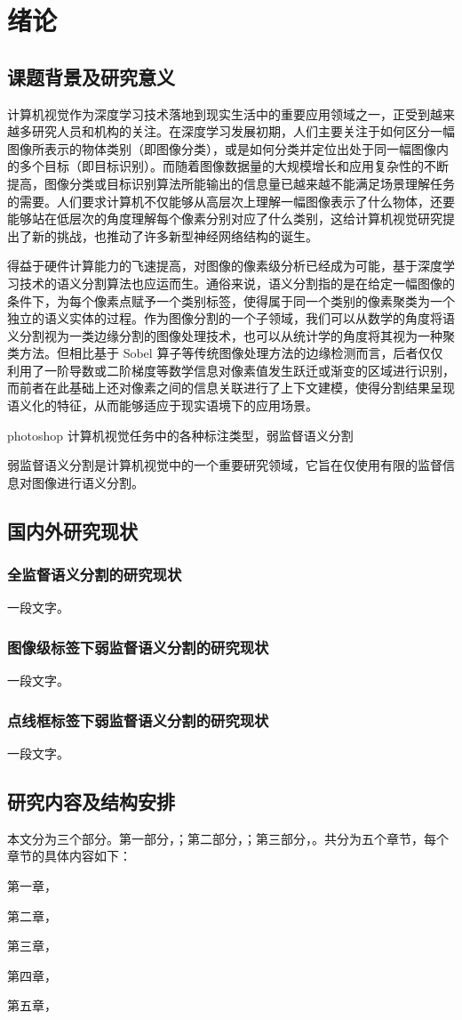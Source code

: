 \chapter{绪论}
\section{课题背景及研究意义}
计算机视觉作为深度学习技术落地到现实生活中的重要应用领域之一，正受到越来越多研究人员和机构的关注。在深度学习发展初期，人们主要关注于如何区分一幅图像所表示的物体类别（即图像分类），或是如何分类并定位出处于同一幅图像内的多个目标（即目标识别）。而随着图像数据量的大规模增长和应用复杂性的不断提高，图像分类或目标识别算法所能输出的信息量已越来越不能满足场景理解任务的需要。人们要求计算机不仅能够从高层次上理解一幅图像表示了什么物体，还要能够站在低层次的角度理解每个像素分别对应了什么类别，这给计算机视觉研究提出了新的挑战，也推动了许多新型神经网络结构的诞生。
\par
得益于硬件计算能力的飞速提高，对图像的像素级分析已经成为可能，基于深度学习技术的语义分割算法也应运而生。通俗来说，语义分割指的是在给定一幅图像的条件下，为每个像素点赋予一个类别标签，使得属于同一个类别的像素聚类为一个独立的语义实体的过程。作为图像分割的一个子领域，我们可以从数学的角度将语义分割视为一类边缘分割的图像处理技术，也可以从统计学的角度将其视为一种聚类方法。但相比基于 Sobel 算子等传统图像处理方法的边缘检测而言，后者仅仅利用了一阶导数或二阶梯度等数学信息对像素值发生跃迁或渐变的区域进行识别，而前者在此基础上还对像素之间的信息关联进行了上下文建模，使得分割结果呈现语义化的特征，从而能够适应于现实语境下的应用场景。
\par
photoshop
计算机视觉任务中的各种标注类型，弱监督语义分割

弱监督语义分割是计算机视觉中的一个重要研究领域，它旨在仅使用有限的监督信息对图像进行语义分割。
\section{国内外研究现状}
\subsection{全监督语义分割的研究现状}
一段文字。
\subsection{图像级标签下弱监督语义分割的研究现状}
一段文字。
\subsection{点线框标签下弱监督语义分割的研究现状}
一段文字。
\section{研究内容及结构安排}
本文分为三个部分。第一部分，；第二部分，；第三部分，。共分为五个章节，每个章节的具体内容如下：
\par
第一章，
\par
第二章，
\par
第三章，
\par
第四章，
\par
第五章，
